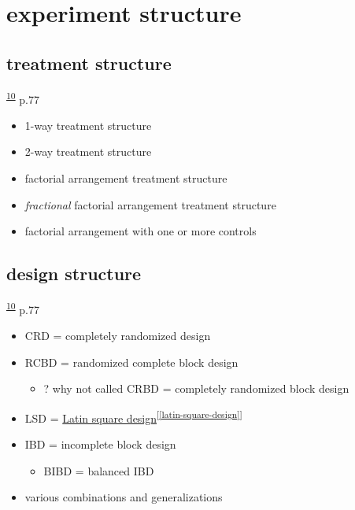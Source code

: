\documentclass[
]{book}
\providecommand{\tightlist}{%
  \setlength{\itemsep}{0pt}\setlength{\parskip}{0pt}}
\theoremstyle{definition}
\theoremstyle{definition}
\theoremstyle{definition}
\theoremstyle{definition}
\theoremstyle{remark}
\begin{document}
\hypertarget{experiment-structure}{%
\section{experiment structure}\label{experiment-structure}}

\hypertarget{treatment-structure}{%
\subsection{treatment structure}\label{treatment-structure}}

\textsuperscript{\protect\hyperlink{ref-milliken2004}{10}} p.77

\begin{itemize}
\tightlist
\item
  1-way treatment structure
\item
  2-way treatment structure
\item
  factorial arrangement treatment structure
\item
  \emph{fractional} factorial arrangement treatment structure
\item
  factorial arrangement with one or more controls
\end{itemize}

\hypertarget{design-structure}{%
\subsection{design structure}\label{design-structure}}

\textsuperscript{\protect\hyperlink{ref-milliken2004}{10}} p.77

\begin{itemize}
\tightlist
\item
  CRD = completely randomized design
\item
  RCBD = randomized complete block design

  \begin{itemize}
  \tightlist
  \item
    ? why not called CRBD = completely randomized block design
  \end{itemize}
\item
  LSD = \protect\hyperlink{latin-square-design}{Latin square design}\textsuperscript{{[}\ref{latin-square-design}{]}}
\item
  IBD = incomplete block design

  \begin{itemize}
  \tightlist
  \item
    BIBD = balanced IBD
  \end{itemize}
\item
  various combinations and generalizations
\end{itemize}
\end{document}
